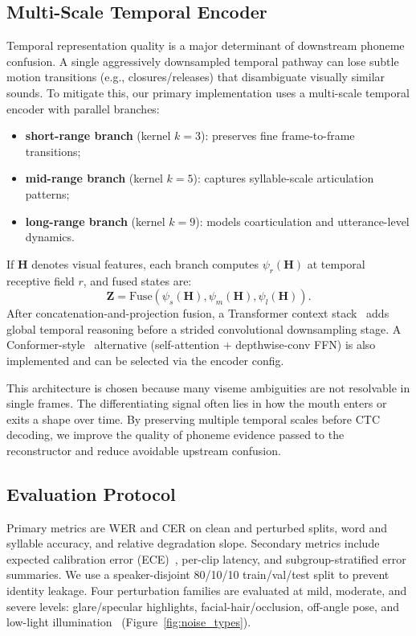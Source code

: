 \documentclass[10pt,twocolumn,letterpaper]{article}
\begin{document}
\subsection{Multi-Scale Temporal Encoder}
Temporal representation quality is a major determinant of downstream phoneme confusion. A single aggressively downsampled temporal pathway can lose subtle motion transitions (e.g., closures/releases) that disambiguate visually similar sounds. To mitigate this, our primary implementation uses a multi-scale temporal encoder with parallel branches:
\begin{itemize}[leftmargin=*]
    \item \textbf{short-range branch} (kernel $k=3$): preserves fine frame-to-frame transitions;
    \item \textbf{mid-range branch} (kernel $k=5$): captures syllable-scale articulation patterns;
    \item \textbf{long-range branch} (kernel $k=9$): models coarticulation and utterance-level dynamics.
\end{itemize}
If $\mathbf{H}$ denotes visual features, each branch computes $\psi_r(\mathbf{H})$ at temporal receptive field $r$, and fused states are:
\begin{equation}
\mathbf{Z}=\text{Fuse}\left(\psi_{s}(\mathbf{H}),\psi_{m}(\mathbf{H}),\psi_{l}(\mathbf{H})\right).
\end{equation}
After concatenation-and-projection fusion, a Transformer context stack~\cite{vaswani2017attention} adds global temporal reasoning before a strided convolutional downsampling stage. A Conformer-style~\cite{conformer2020} alternative (self-attention + depthwise-conv FFN) is also implemented and can be selected via the encoder config.

This architecture is chosen because many viseme ambiguities are not resolvable in single frames. The differentiating signal often lies in how the mouth enters or exits a shape over time. By preserving multiple temporal scales before CTC decoding, we improve the quality of phoneme evidence passed to the reconstructor and reduce avoidable upstream confusion.

\subsection{Evaluation Protocol}
Primary metrics are WER and CER on clean and perturbed splits, word and syllable accuracy, and relative degradation slope. Secondary metrics include expected calibration error (ECE)~\cite{guo2017calibration}, per-clip latency, and subgroup-stratified error summaries. We use a speaker-disjoint 80/10/10 train/val/test split to prevent identity leakage. Four perturbation families are evaluated at mild, moderate, and severe levels: glare/specular highlights, facial-hair/occlusion, off-angle pose, and low-light illumination~\cite{hong2023watchorlisten} (Figure~\ref{fig:noise_types}).
\end{document}
